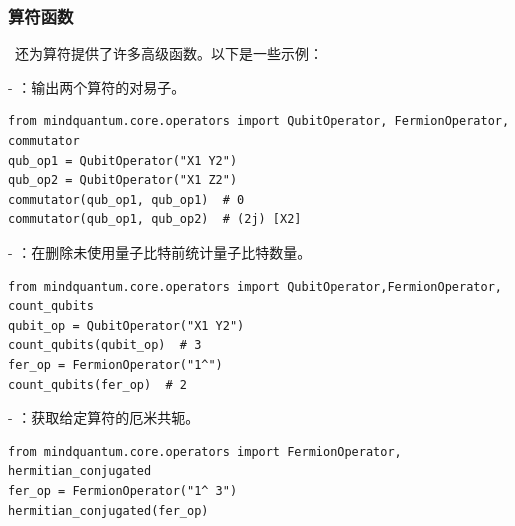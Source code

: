 \subsubsection{算符函数}

\MindQuantum\ 还为算符提供了许多高级函数。以下是一些示例：

- ：输出两个算符的对易子。

\begin{lstlisting}
from mindquantum.core.operators import QubitOperator, FermionOperator, commutator
qub_op1 = QubitOperator("X1 Y2")
qub_op2 = QubitOperator("X1 Z2")
commutator(qub_op1, qub_op1)  # 0
commutator(qub_op1, qub_op2)  # (2j) [X2]
\end{lstlisting}

- ：在删除未使用量子比特前统计量子比特数量。

\begin{lstlisting}
from mindquantum.core.operators import QubitOperator,FermionOperator, count_qubits
qubit_op = QubitOperator("X1 Y2")
count_qubits(qubit_op)  # 3
fer_op = FermionOperator("1^")
count_qubits(fer_op)  # 2
\end{lstlisting}


- ：获取给定算符的厄米共轭。

\begin{lstlisting}
from mindquantum.core.operators import FermionOperator, hermitian_conjugated
fer_op = FermionOperator("1^ 3")
hermitian_conjugated(fer_op)
\end{lstlisting}

